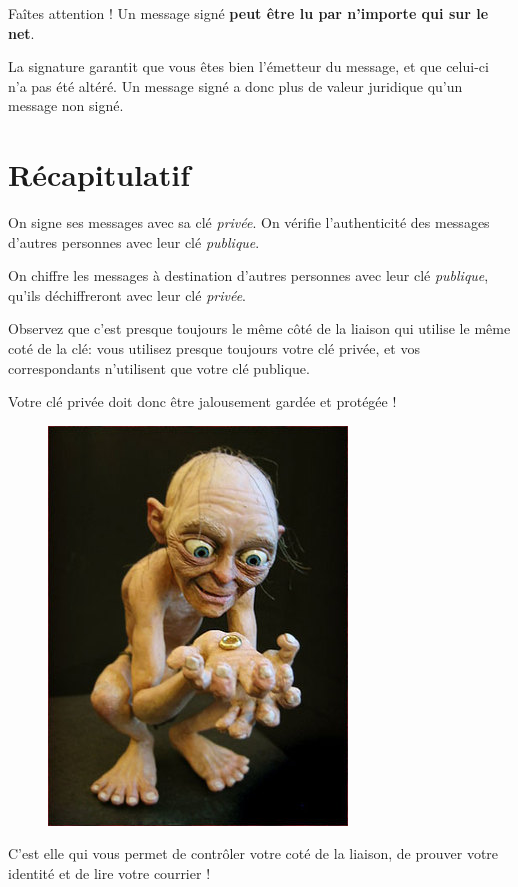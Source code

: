 Faîtes attention ! Un message signé \textbf{peut être lu par n'importe
qui sur le net}.

La signature garantit que vous êtes bien l'émetteur du message, et que
celui-ci n'a pas été altéré. Un message signé a donc plus de valeur
juridique qu'un message non signé.

\section{Récapitulatif}\label{ruxe9capitulatif}

On signe ses messages avec sa clé \emph{privée}. On vérifie
l'authenticité des messages d'autres personnes avec leur clé
\emph{publique}.

On chiffre les messages à destination d'autres personnes avec leur clé
\emph{publique}, qu'ils déchiffreront avec leur clé \emph{privée}.

Observez que c'est presque toujours le même côté de la liaison qui
utilise le même coté de la clé: vous utilisez presque toujours votre clé
privée, et vos correspondants n'utilisent que votre clé publique.

Votre clé privée doit donc être jalousement gardée et protégée !

\begin{figure}[h]
\centering
\includegraphics[width=0.5\linewidth]{./images/gollum.jpg}
\end{figure}

C'est elle qui vous permet de contrôler votre coté de la liaison, de
prouver votre identité et de lire votre courrier !